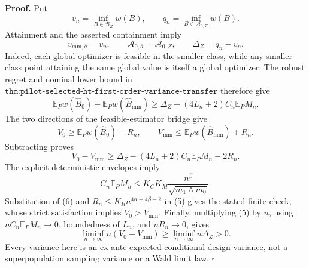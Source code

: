 \textbf{Proof.}
Put
\[
v_n=\inf_{B\in\mathcal B_Z}w(B),
\qquad q_n=\inf_{B\in\mathcal A_{0,Z}}w(B).
\tag{1}
\]
Attainment and the asserted containment imply
\[
v_{\mathrm{mm},\overline a}=v_n,
\qquad
\mathcal A_{0,\overline a}=\mathcal A_{0,Z},
\qquad
\Delta_Z=q_n-v_n.
\tag{2}
\]
Indeed, each global optimizer is feasible in the smaller class, while any smaller-class point attaining the same global value is itself a global optimizer.  The robust regret and nominal lower bound in \(\texttt{thm:pilot-selected-ht-first-order-variance-transfer}\) therefore give
\[
\mathbb E_Pw(\widehat B_0)-\mathbb E_Pw(\widehat B_{\mathrm{mm}})
\ge\Delta_Z-(4L_n+2)C_n\mathbb E_PM_n.
\tag{3}
\]
The two directions of the feasible-estimator bridge give
\[
V_0\ge\mathbb E_Pw(\widehat B_0)-R_n,
\qquad
V_{\mathrm{mm}}\le\mathbb E_Pw(\widehat B_{\mathrm{mm}})+R_n.
\tag{4}
\]
Subtracting proves
\[
V_0-V_{\mathrm{mm}}
\ge\Delta_Z-(4L_n+2)C_n\mathbb E_PM_n-2R_n.
\tag{5}
\]
The explicit deterministic envelopes imply
\[
C_n\mathbb E_PM_n\le K_CK_M\frac{n^\beta}{\sqrt{m_1\wedge m_0}}.
\tag{6}
\]
Substitution of (6) and \(R_n\le K_Rn^{4\alpha+4\beta-2}\) in (5) gives the stated finite check, whose strict satisfaction implies \(V_0>V_{\mathrm{mm}}\).  Finally, multiplying (5) by \(n\), using \(nC_n\mathbb E_PM_n\to0\), boundedness of \(L_n\), and \(nR_n\to0\), gives
\[
\liminf_{n\to\infty}n(V_0-V_{\mathrm{mm}})
\ge\liminf_{n\to\infty}n\Delta_Z>0.
\]
Every variance here is an ex ante expected conditional design variance, not a superpopulation sampling variance or a Wald limit law. \(\square\)